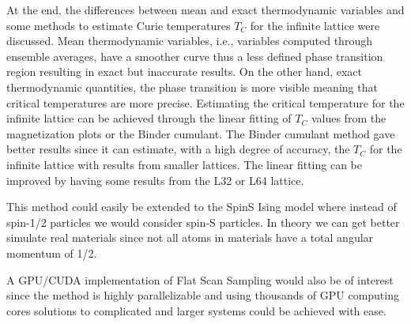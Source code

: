 	At the end, the differences between mean and exact thermodynamic variables and some methods to estimate Curie temperatures $T_C$ for the infinite lattice were discussed. Mean thermodynamic variables, i.e., variables computed through ensemble averages, have a smoother curve thus a less defined phase transition region resulting in exact but inaccurate results. On the other hand, exact thermodynamic quantities, the phase transition is more visible meaning that critical temperatures are more precise. Estimating the critical temperature for the infinite lattice can be achieved through the linear fitting of $T_C$ values from the magnetization plots or the Binder cumulant. The Binder cumulant method gave better results since it can estimate, with a high degree of accuracy, the $T_C$ for the infinite lattice with results from smaller lattices. The linear fitting can be improved by having some results from the L32 or L64 lattice.

	This method could easily be extended to the SpinS Ising model where instead of spin-1/2 particles we would consider spin-S particles. In theory we can get better simulate real materials since not all atoms in materials have a total angular momentum of 1/2. 
	
	A GPU/CUDA implementation of Flat Scan Sampling would also be of interest since the method is highly parallelizable and using thousands of GPU computing cores solutions to complicated and larger systems could be achieved with ease.
	
	
	
	